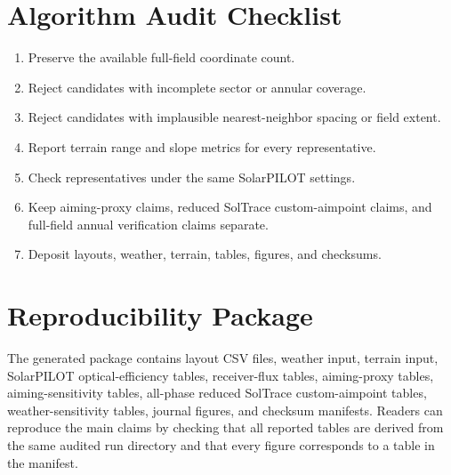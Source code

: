 \documentclass[final,3p,times]{elsarticle}
\begin{document}
\appendix
\section{Algorithm Audit Checklist}
\begin{enumerate}[leftmargin=*]
\item Preserve the available full-field coordinate count.
\item Reject candidates with incomplete sector or annular coverage.
\item Reject candidates with implausible nearest-neighbor spacing or field extent.
\item Report terrain range and slope metrics for every representative.
\item Check representatives under the same SolarPILOT settings.
\item Keep aiming-proxy claims, reduced SolTrace custom-aimpoint claims, and full-field annual verification claims separate.
\item Deposit layouts, weather, terrain, tables, figures, and checksums.
\end{enumerate}

\section{Reproducibility Package}
The generated package contains layout CSV files, weather input, terrain input, SolarPILOT optical-efficiency tables, receiver-flux tables, aiming-proxy tables, aiming-sensitivity tables, all-phase reduced SolTrace custom-aimpoint tables, weather-sensitivity tables, journal figures, and checksum manifests. Readers can reproduce the main claims by checking that all reported tables are derived from the same audited run directory and that every figure corresponds to a table in the manifest.
\end{document}
